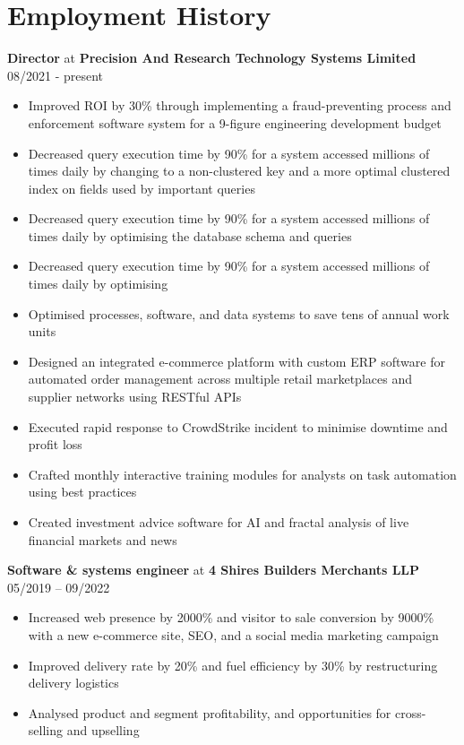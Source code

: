 \documentclass[10pt,a4paper]{article}
\begin{document}
\section*{Employment History}\vspace{-\baselineskip}\medskip
\textbf{Director} at \textbf{Precision And Research Technology Systems Limited} \hfill 08/2021 - present\vspace{-\baselineskip}\medskip
\begin{itemize}[noitemsep]
   \item Improved ROI by 30\% through implementing a fraud-preventing process and enforcement software system for a 9-figure engineering development budget
   \item Decreased query execution time by 90\% for a system accessed millions of times daily by changing to a non-clustered key and a more optimal clustered index on fields used by important queries
   \item Decreased query execution time by 90\% for a system accessed millions of times daily by optimising the database schema and queries
   \item Decreased query execution time by 90\% for a system accessed millions of times daily by optimising 
   \item Optimised processes, software, and data systems to save tens of annual work units
   \item Designed an integrated e-commerce platform with custom ERP software for automated order management across multiple retail marketplaces and supplier networks using RESTful APIs
   \item Executed rapid response to CrowdStrike incident to minimise downtime and profit loss
   \item Crafted monthly interactive training modules for analysts on task automation using best practices
   \item Created investment advice software for AI and fractal analysis of live financial markets and news
\end{itemize}
\textbf{Software \& systems engineer} at \textbf{4 Shires Builders Merchants LLP} \hfill 05/2019 -- 09/2022\vspace{-\baselineskip}\medskip
\begin{itemize}[noitemsep]
   \item Increased web presence by 2000\% and visitor to sale conversion by 9000\% with a new e-commerce site, SEO, and a social media marketing campaign
   \item Improved delivery rate by 20\% and fuel efficiency by 30\% by restructuring delivery logistics
   \item Analysed product and segment profitability, and opportunities for cross-selling and upselling
\end{itemize}
\end{document}
